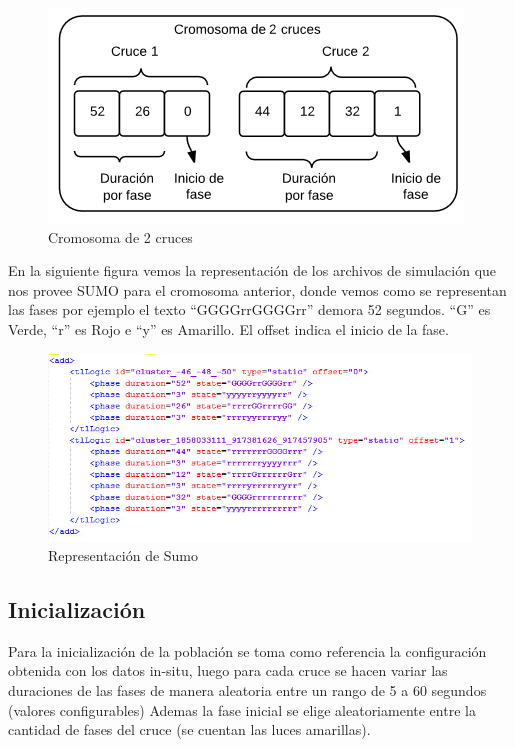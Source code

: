 \begin{figure}[h]
\centering
\includegraphics[width=0.7\linewidth]{Figures/cromosoma1}
\caption{Cromosoma de 2 cruces}
\label{fig:cromosoma1}
\end{figure}

En la siguiente figura vemos la representación de los archivos de simulación que nos provee SUMO para el cromosoma anterior, donde vemos como se representan las fases por ejemplo el texto “GGGGrrGGGGrr” demora 52 segundos. “G” es Verde, “r” es Rojo e “y” es Amarillo. El offset indica el inicio de la fase.

\begin{figure}[h]
\centering
\includegraphics[width=\linewidth]{Figures/rep_sumo}
\caption{Representación de Sumo}
\label{fig:rep_sumo}
\end{figure}


\subsection{Inicialización}

Para la inicialización de la población se toma como referencia
la configuración obtenida con los datos in-situ, luego para cada
cruce se hacen variar las duraciones de las fases de manera aleatoria entre un rango de  5 a 60  segundos  (valores configurables)
Ademas la fase inicial se elige aleatoriamente entre la cantidad de fases del cruce (se cuentan las luces amarillas).

